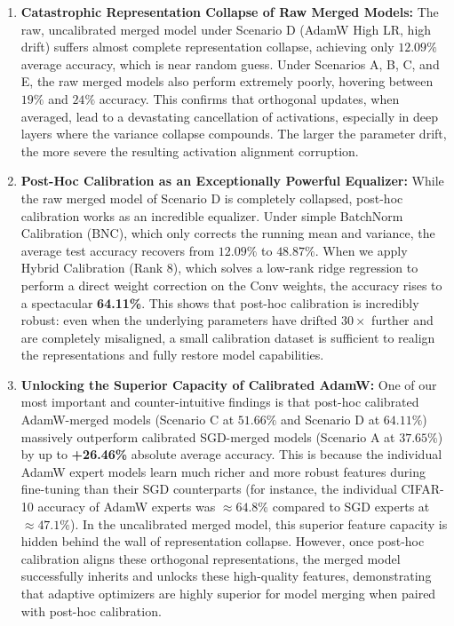 \documentclass{article}
\theoremstyle{plain}
\theoremstyle{definition}
\theoremstyle{remark}
\begin{document}
\begin{enumerate}
    \item \textbf{Catastrophic Representation Collapse of Raw Merged Models:} The raw, uncalibrated merged model under Scenario D (AdamW High LR, high drift) suffers almost complete representation collapse, achieving only $12.09\%$ average accuracy, which is near random guess. Under Scenarios A, B, C, and E, the raw merged models also perform extremely poorly, hovering between $19\%$ and $24\%$ accuracy. This confirms that orthogonal updates, when averaged, lead to a devastating cancellation of activations, especially in deep layers where the variance collapse compounds. The larger the parameter drift, the more severe the resulting activation alignment corruption.
    \item \textbf{Post-Hoc Calibration as an Exceptionally Powerful Equalizer:} While the raw merged model of Scenario D is completely collapsed, post-hoc calibration works as an incredible equalizer. Under simple BatchNorm Calibration (BNC), which only corrects the running mean and variance, the average test accuracy recovers from $12.09\%$ to $48.87\%$. When we apply Hybrid Calibration (Rank 8), which solves a low-rank ridge regression to perform a direct weight correction on the Conv weights, the accuracy rises to a spectacular \textbf{64.11\%}. This shows that post-hoc calibration is incredibly robust: even when the underlying parameters have drifted $30\times$ further and are completely misaligned, a small calibration dataset is sufficient to realign the representations and fully restore model capabilities.
    \item \textbf{Unlocking the Superior Capacity of Calibrated AdamW:} One of our most important and counter-intuitive findings is that post-hoc calibrated AdamW-merged models (Scenario C at $51.66\%$ and Scenario D at $64.11\%$) massively outperform calibrated SGD-merged models (Scenario A at $37.65\%$) by up to \textbf{+26.46\%} absolute average accuracy. This is because the individual AdamW expert models learn much richer and more robust features during fine-tuning than their SGD counterparts (for instance, the individual CIFAR-10 accuracy of AdamW experts was $\approx 64.8\%$ compared to SGD experts at $\approx 47.1\%$). In the uncalibrated merged model, this superior feature capacity is hidden behind the wall of representation collapse. However, once post-hoc calibration aligns these orthogonal representations, the merged model successfully inherits and unlocks these high-quality features, demonstrating that adaptive optimizers are highly superior for model merging when paired with post-hoc calibration.
\end{enumerate}
\end{document}
